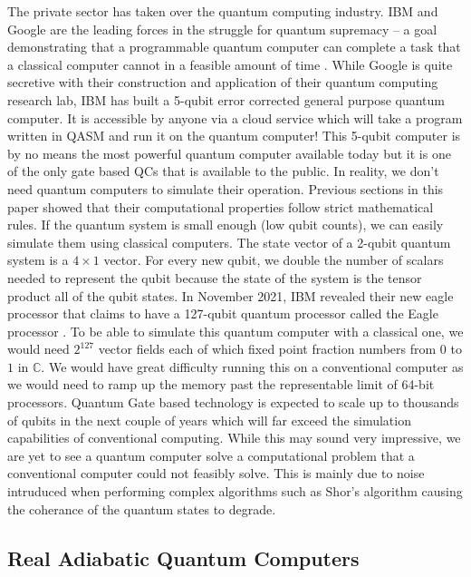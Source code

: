 \documentclass[conference]{IEEEtran}
\begin{document}
The private sector has taken over the quantum computing industry. IBM and Google are the leading forces in the struggle for quantum supremacy -- a goal demonstrating that a programmable quantum computer can complete a task that a classical computer cannot in a feasible amount of time \cite{b14}. While Google is quite secretive with their construction and application of their quantum computing research lab, IBM has built a 5-qubit error corrected general purpose quantum computer. It is accessible by anyone via a cloud service which will take a program written in QASM and run it on the quantum computer! This 5-qubit computer is by no means the most powerful quantum computer available today but it is one of the only gate based QCs that is available to the public. In reality, we don't need quantum computers to simulate their operation. Previous sections in this paper showed that their computational properties follow strict mathematical rules. If the quantum system is small enough (low qubit counts), we can easily simulate them using classical computers. The state vector of a 2-qubit quantum system is a $4\times 1$ vector. For every new qubit, we double the number of scalars needed to represent the qubit because the state of the system is the tensor product all of the qubit states. In November 2021, IBM revealed their new eagle processor that claims to have a 127-qubit quantum processor called the Eagle processor \cite{b15}. To be able to simulate this quantum computer with a classical one, we would need $2^{127}$ vector fields each of which fixed point fraction numbers from $0$ to $1$ in $\mathbb{C}$. We would have great difficulty running this on a conventional computer as we would need to ramp up the memory past the representable limit of 64-bit processors. Quantum Gate based technology is expected to scale up to thousands of qubits in the next couple of years which will far exceed the simulation capabilities of conventional computing. While this may sound very impressive, we are yet to see a quantum computer solve a computational problem that a conventional computer could not feasibly solve. This is mainly due to noise intruduced when performing complex algorithms such as Shor's algorithm causing the coherance of the quantum states to degrade.

\subsection{Real Adiabatic Quantum Computers}
\end{document}
